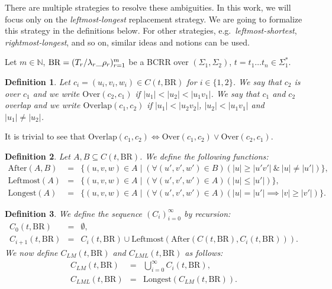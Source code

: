 \documentclass{article}
\newtheorem{definition}{Definition}[section]
\newcommand{\len}[1]{\ensuremath{\left| #1 \right|}}
\begin{document}
	There are multiple strategies to resolve these ambiguities. In this work, we will focus only on the \emph{leftmost-longest} replacement strategy. We are going to formalize this strategy in the definitions below.
	For other strategies, e.g.\ \emph{leftmost-shortest}, \emph{rightmost-longest}, and so on, similar ideas and notions can be used.

	Let $m \in \mathbb{N}$, $\mathrm{BR}=\bcrr{m}$ be a BCRR over $(\Sigma_1, \Sigma_2)$, $t = t_1\ldots t_n \in \Sigma_1^*$.

	\begin{definition} \label{def:overlap}
		Let $c_i = (u_i, v_i, w_i) \in C(t, \mathrm{BR})$ for $i \in \{1, 2\}$.
		We say that $c_2$ is over $c_1$ and we write $\mathrm{Over}(c_2, c_1)$ if
		$\len{u_1} < \len{u_2} < \len{u_1v_1}$.
		We say that $c_1$ and $c_2$ overlap and we write $\mathrm{Overlap}(c_1, c_2)$ if $\len{u_1} < \len{u_2v_2}$, $\len{u_2} < \len{u_1v_1}$ and $\len{u_1} \ne \len{u_2}$.
	\end{definition}
	
	It is trivial to see that
	\( \mathrm{Overlap}(c_1, c_2) \iff \mathrm{Over}(c_1, c_2) \lor \mathrm{Over}(c_2, c_1) \).
	\begin{definition} \label{def:after,leftmost,longest}
		Let $A, B \subseteq C(t, \mathrm{BR})$. We define the following functions:
		\begin{eqnarray*}
			\mathrm{After}(A, B) & = & \{(u, v, w) \in A \mid (\forall (u', v', w') \in B)(
				\len{u} \ge \len{u'v'}\ \&\ \len{u} \ne \len{u'})\}, \\
			\mathrm{Leftmost}(A) & = & \{(u, v, w) \in A \mid (\forall (u', v', w') \in A)(\len{u} \le \len{u'})\}, \\
			\mathrm{Longest}(A) & = & \{(u, v, w) \in A \mid (\forall (u', v', w') \in A)( 
				\len{u} = \len{u'} \implies \len{v} \ge \len{v'})\}.
		\end{eqnarray*}
	\end{definition}
		
	\begin{definition} \label{def:C_{LML}}
		We define the sequence $(C_i)_{i=0}^\infty$ by recursion:
		\begin{eqnarray*}
			C_0(t, \mathrm{BR}) & = & \emptyset, \\
			C_{i+1}(t, \mathrm{BR}) & = & C_i(t, \mathrm{BR}) \cup \mathrm{Leftmost}(\mathrm{After}(C(t, \mathrm{BR}), C_i(t, \mathrm{BR}))).
		\end{eqnarray*}
		We now define $C_{LM}(t, \mathrm{BR})$ and $C_{LML}(t, \mathrm{BR})$ as follows:
		\begin{eqnarray*}
			C_{LM}(t, \mathrm{BR}) & = & \bigcup_{i=0}^\infty C_i(t, \mathrm{BR}), \\
			C_{LML}(t, \mathrm{BR}) & = & \mathrm{Longest}(C_{LM}(t, \mathrm{BR})).
		\end{eqnarray*}
	\end{definition}
\end{document}
